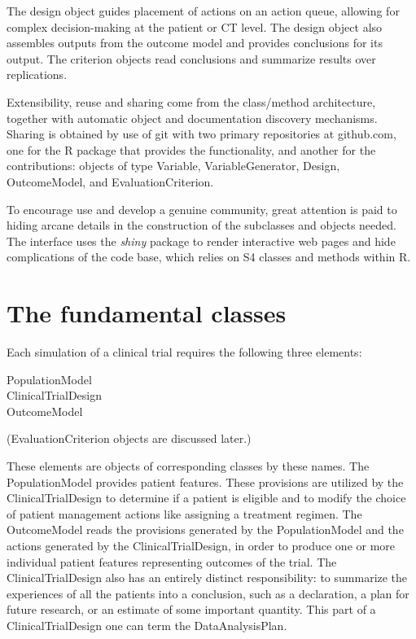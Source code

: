 \documentclass[12pt]{amsart}
\begin{document}
The design object guides placement of actions on an action queue, 
allowing for complex decision-making at the patient or CT level. 
The design object also assembles outputs from the outcome model and provides conclusions for its output. 
The criterion objects read conclusions and summarize results over replications.

Extensibility, reuse and sharing come from the class/method architecture, together with automatic object and documentation discovery mechanisms.
Sharing is obtained by use of git with two primary repositories at github.com,
one for the 
R package that provides the functionality,
and another for the contributions:
objects of type Variable, VariableGenerator, Design, OutcomeModel, and EvaluationCriterion.

To encourage use and develop a genuine community,
great attention is paid to hiding arcane details in the construction of the
subclasses and objects needed.
The interface uses the \emph{shiny} package to render interactive web pages and hide complications of the code base, which relies on S4 classes and methods within R. 


\section{The fundamental classes}

Each simulation of a clinical trial requires the following three elements:
\begin{description}
\item[ PopulationModel]
\item[ ClinicalTrialDesign]
\item[ OutcomeModel]
\end{description}
(EvaluationCriterion objects are discussed later.)

These elements are objects of corresponding classes by these names.
The PopulationModel provides patient features.
These provisions are utilized by the ClinicalTrialDesign
to determine if a patient is eligible
and to modify the choice of patient management actions
like assigning a treatment regimen.
The OutcomeModel reads the provisions generated by the
PopulationModel and the actions generated by the ClinicalTrialDesign,
in order to produce one or more individual patient features
representing outcomes of the trial.
The ClinicalTrialDesign also has an entirely distinct  responsibility:
to summarize the experiences of all the patients into
a conclusion, such as a declaration, a plan for future research,
or an estimate of some important quantity.
This part of a ClinicalTrialDesign one can term the
DataAnalysisPlan.
\end{document}

